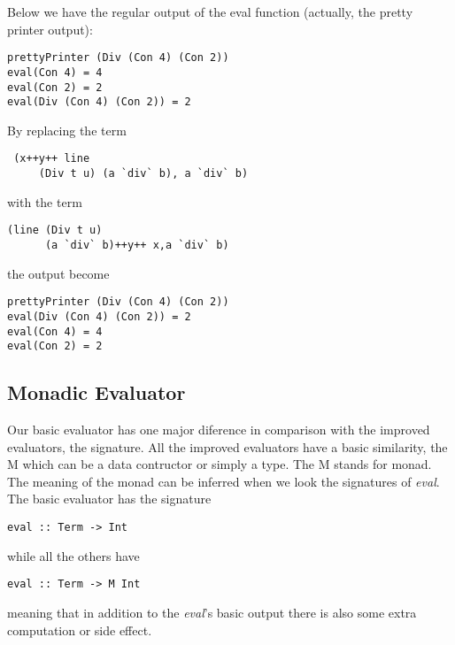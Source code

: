 \documentclass[twocolumn,10pt]{article}
\begin{document}
Below we have the regular output of the eval function (actually, the pretty printer output):

\lstset{language=Haskell}
\begin{lstlisting}
prettyPrinter (Div (Con 4) (Con 2))
eval(Con 4) = 4
eval(Con 2) = 2
eval(Div (Con 4) (Con 2)) = 2
\end{lstlisting}

By replacing the term

\lstset{language=Haskell}
\begin{lstlisting}
 (x++y++ line 
     (Div t u) (a `div` b), a `div` b)
\end{lstlisting}

with the term

\lstset{language=Haskell}
\begin{lstlisting}
(line (Div t u)
      (a `div` b)++y++ x,a `div` b)
\end{lstlisting}

the output become

\lstset{language=Haskell}
\begin{lstlisting}
prettyPrinter (Div (Con 4) (Con 2))
eval(Div (Con 4) (Con 2)) = 2
eval(Con 4) = 4
eval(Con 2) = 2
\end{lstlisting}

\subsection{Monadic Evaluator}

Our basic evaluator has one major diference in comparison with the improved evaluators, the signature. All the improved evaluators have a basic similarity, the M which can be a data contructor or simply a type. The M stands for monad. The meaning of the monad can be inferred when we look the signatures of \textit{eval}. The basic evaluator has the signature

\lstset{language=Haskell}
\begin{lstlisting}
eval :: Term -> Int
\end{lstlisting}

while all the others have

\lstset{language=Haskell}
\begin{lstlisting}
eval :: Term -> M Int
\end{lstlisting}

meaning that in addition to the \textit{eval}'s basic output there is also some extra computation or side effect. 
\end{document}
